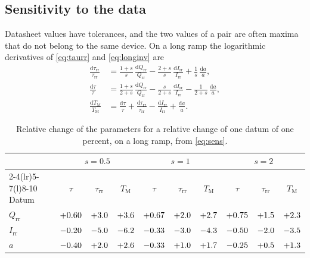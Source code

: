 \documentclass[10pt,a4paper]{scrartcl}
\newcommand{\Irr}{I_\mathrm{rr}}
\newcommand{\Qrr}{Q_\mathrm{rr}}
\newcommand{\taurr}{\tau_\mathrm{rr}}
\newcommand{\TM}{T_\mathrm{M}}
\newcommand{\diff}{\mathrm{d}}
\begin{document}
\subsection{Sensitivity to the data}
\label{sec:sens}
Datasheet values have tolerances, and the two values of a pair are often maxima that do not belong to the same device. On a long ramp the logarithmic derivatives of \eqref{eq:taurr} and \eqref{eq:longinv} are
\begin{equation}
\begin{aligned}
\frac{\diff\taurr}{\taurr} &= \frac{1+s}{s}\,\frac{\diff\Qrr}{\Qrr} - \frac{2+s}{s}\,\frac{\diff\Irr}{\Irr} + \frac{1}{s}\,\frac{\diff a}{a} , \\
\frac{\diff\tau}{\tau} &= \frac{1+s}{2+s}\,\frac{\diff\Qrr}{\Qrr} - \frac{s}{2+s}\,\frac{\diff\Irr}{\Irr} - \frac{1}{2+s}\,\frac{\diff a}{a} , \\
\frac{\diff\TM}{\TM} &= \frac{\diff\tau}{\tau} + \frac{\diff\taurr}{\taurr} - \frac{\diff\Irr}{\Irr} + \frac{\diff a}{a} .
\end{aligned}
\label{eq:sens}
\end{equation}

\begin{table}[htb]
\centering\small
\caption{Relative change of the parameters for a relative change of one datum of one percent, on a long ramp, from \eqref{eq:sens}.}
\label{tab:sens}
\begin{tabular}{@{}lccccccccc@{}}
\toprule
 & \multicolumn{3}{c}{$s = 0.5$} & \multicolumn{3}{c}{$s = 1$} & \multicolumn{3}{c}{$s = 2$} \\
\cmidrule(lr){2-4}\cmidrule(lr){5-7}\cmidrule(l){8-10}
Datum & $\tau$ & $\taurr$ & $\TM$ & $\tau$ & $\taurr$ & $\TM$ & $\tau$ & $\taurr$ & $\TM$ \\
\midrule
$\Qrr$ & $+0.60$ & $+3.0$ & $+3.6$ & $+0.67$ & $+2.0$ & $+2.7$ & $+0.75$ & $+1.5$ & $+2.3$ \\
$\Irr$ & $-0.20$ & $-5.0$ & $-6.2$ & $-0.33$ & $-3.0$ & $-4.3$ & $-0.50$ & $-2.0$ & $-3.5$ \\
$a$ & $-0.40$ & $+2.0$ & $+2.6$ & $-0.33$ & $+1.0$ & $+1.7$ & $-0.25$ & $+0.5$ & $+1.3$ \\
\bottomrule
\end{tabular}
\end{table}
\end{document}
